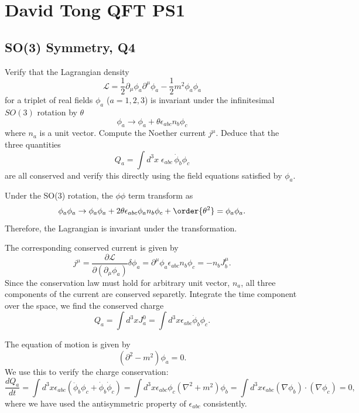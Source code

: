 \section{David Tong QFT PS1}
\subsection{SO(3) Symmetry, Q4}
Verify that the Lagrangian density
\begin{equation}
    \mathcal{L} = \frac{1}{2}\partial_\mu\phi_a\partial^\mu\phi_a - \frac{1}{2}m^2\phi_a\phi_a
\end{equation}
for a triplet of real fields $\phi_a$ ($a=1,2,3$) is invariant under the infinitesimal $SO(3)$ rotation by $\theta$
\begin{equation}
    \phi_a \rightarrow \phi_a + \theta\epsilon_{abc}n_b\phi_c
\end{equation}
where $n_a$ is a unit vector. Compute the Noether current $j^\mu$. Deduce that the three quantities
\begin{equation}
    Q_a = \int d^3x\; \epsilon_{abc}\,\dot{\phi}_b\phi_c
\end{equation}
are all conserved and verify this directly using the field equations satisfied by $\phi_a$.
\begin{solution}
    Under the SO(3) rotation, the $\phi\phi$ term transform as
    \begin{equation}
        \phi_a\phi_a \to \phi_a\phi_a + 2\theta\epsilon_{abc}\phi_an_b\phi_c + \order{\theta^2} = \phi_a\phi_a.
    \end{equation}
    Therefore, the Lagrangian is invariant under the transformation.

    The corresponding conserved current is given by
    \begin{equation}
        j^\mu = \frac{\partial\mathcal{L}}{\partial(\partial_\mu\phi_a)}\delta\phi_a = \partial^\mu \phi_a\epsilon_{abc}n_b\phi_c = -n_b J_b^\mu.
    \end{equation}
    Since the conservation law must hold for arbitrary unit vector, $n_a$, all three components of the current are conserved separetly.
    Integrate the time component over the space, we find the conserved charge
    \begin{equation}
        Q_a = \int d^3x J^0_a = \int d^3x \epsilon_{abc}\dot{\phi}_b \phi_c.
    \end{equation}

    The equation of motion is given by
    \begin{equation}
        (\partial^2-m^2)\phi_a = 0.
    \end{equation}
    We use this to verify the charge conservation:
    \begin{equation}
        \frac{d Q_a}{dt} = \int d^3x \epsilon_{abc}(\ddot{\phi}_b\phi_c + \dot{\phi}_b\dot{\phi}_c) = \int d^3x \epsilon_{abc}\phi_c(\nabla^2 +m^2)\phi_b = \int d^3x \epsilon_{abc}(\nabla\phi_b) \cdot (\nabla\phi_c) = 0,
    \end{equation}
    where we have used the antisymmetric property of $\epsilon_{abc}$ consistently.
\end{solution}

